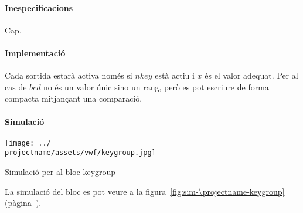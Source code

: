 \paragraph{Inespecificacions}

Cap.

\paragraph{Implementació}




Cada sortida estarà activa només si $nkey$ està actiu i $x$ és el valor adequat.
Per al cas de $bcd$ no és un valor únic sino un rang, però es pot escriure de
forma compacta mitjançant una comparació.

\paragraph{Simulació}

\begin{contendfig}
  \begin{center}
    \texttt{[image: ../\\projectname/assets/vwf/keygroup.jpg]}
  \end{center}
  \caption{\label{fig:sim-\projectname-keygroup} Simulació per al bloc \textsf{keygroup}}
\end{contendfig}

La simulació del bloc es pot veure a la figura~\ref{fig:sim-\projectname-keygroup} (pàgina~\pageref{fig:sim-\projectname-keygroup}).


\vspace{1cm}

